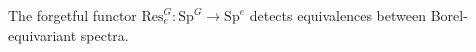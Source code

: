 The forgetful functor $\mathrm{Res}_e^G\colon \mathrm{Sp}^G\rightarrow \mathrm{Sp}^e$ detects equivalences between Borel-equivariant spectra.
